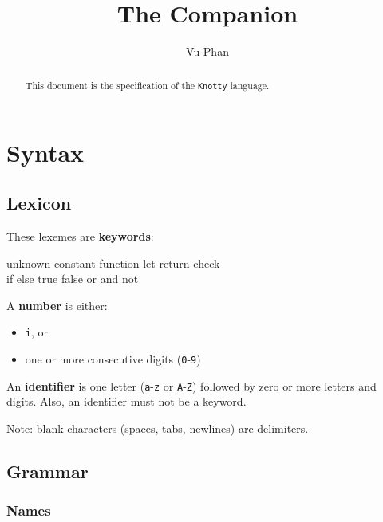 \documentclass[letterpaper, 12pt]{extarticle}
\title{The \kn{} Companion}
\author{Vu Phan}
\theoremstyle{definition} %
\newcommand{\textdef}[1]{\textbf{#1}}
\newcommand{\code}[1]{\texttt{#1}}
\newcommand{\kn}{\code{Knotty}}
\newenvironment{codeblock}
    {\begin{addmargin}{0.5in} \ttfamily}
    {\end{addmargin} \par}
\begin{document}
\maketitle

\begin{abstract}
This document is the specification of the \kn{} language.
\end{abstract}

\tableofcontents

\thispagestyle{fancy}


\section{Syntax}


\subsection{Lexicon}

These lexemes are \textdef{keywords}:
\begin{codeblock}
unknown constant function let return check \\
if else true false or and not
\end{codeblock}

A \textdef{number} is either:
\begin{itemize}
\item \code{i}, or
\item one or more consecutive digits
(\code{0}-\code{9})
\end{itemize}

An \textdef{identifier} is one letter
(\code{a}-\code{z} or \code{A}-\code{Z})
followed by zero or more letters and digits.
Also, an identifier must not be a keyword.

Note: blank characters (spaces, tabs, newlines)
are delimiters.


\subsection{Grammar}

\subsubsection{Names}
\end{document}
